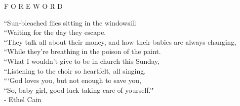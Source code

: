 \documentclass[12pt]{article}
\begin{document}
\begingroup
\begin{center}
\end{center}
\endgroup

\vspace{15\baselineskip}

\begingroup
\begin{center}
\huge F O R E W O R D
\end{center}
\endgroup

\vspace{3\baselineskip}

\begingroup
\begin{center}
``Sun-bleached flies sitting in the windowsill \\
``Waiting for the day they escape. \\
``They talk all about their money, and how their babies are always changing, \\
``While they're breathing in the poison of the paint. \\
``What I wouldn't give to be in church this Sunday, \\
``Listening to the choir so heartfelt, all singing, \\
```God loves you, but not enough to save you, \\
``So, baby girl, good luck taking care of yourself.'" \\
- Ethel Cain
\end{center}
\endgroup
\end{document}
